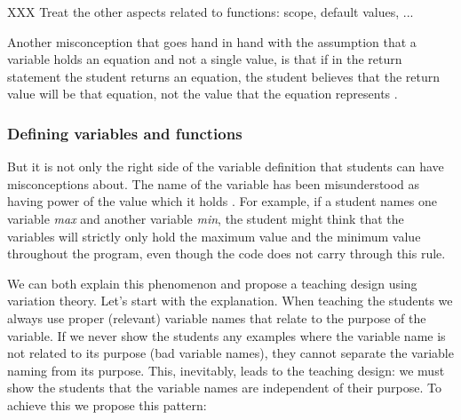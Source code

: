 XXX Treat the other aspects related to functions: scope, default values, ...

Another misconception that goes hand in hand with the assumption that a 
variable holds an equation and not a single value, is that if in the return 
statement the student returns an equation, the student believes that the return 
value will be that equation, not the value that the equation represents 
\parencite{Kohn2017VariableEvaluation}.


\subsubsection{Defining variables and functions}

But it is not only the right side of the variable definition that students 
can 
have misconceptions about. The name of the variable has been misunderstood 
as 
having power of the value which it holds 
\parencite{MisconceptionsSurvey2017,Sleeman1984}. For example, if a student 
names one variable \emph{max} and another variable \emph{min}, the student 
might think that the variables will strictly only hold the maximum value 
and 
the minimum value throughout the program, even though the code does not 
carry through this rule. 

We can both explain this phenomenon and propose a teaching design using 
variation theory.
Let's start with the explanation.
When teaching the students we always use proper (\ie relevant) variable 
names 
that relate to the purpose of the variable.
If we never show the students any examples where the variable name is not 
related to its purpose (bad variable names), they cannot separate the 
variable 
naming from its purpose.
This, inevitably, leads to the teaching design:
we must show the students that the variable names are independent of their 
purpose. To achieve this we propose this pattern:

